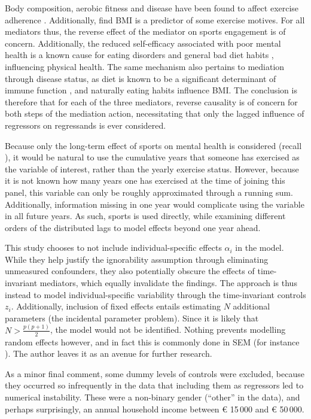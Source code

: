 Body composition, aerobic fitness and disease have been found to affect exercise adherence \cite{abernethy2012biophysical}.
Additionally,  find BMI is a predictor of some exercise motives.
For all mediators thus, the reverse effect of the mediator on sports engagement is of concern.
Additionally, the reduced self-efficacy associated with poor mental health is a known cause for
eating disorders and general bad diet habits \cite{oellingrath2014eating}, influencing physical health.
The same mechanism also pertains to mediation through disease status, as diet is known to be a
significant determinant of immune function \cite{childs2019diet}, and naturally eating habits influence BMI.
The conclusion is therefore that for each of the three mediators,
reverse causality is of concern for both steps of the mediation action,
necessitating that only the lagged influence of regressors on regressands is ever considered.

Because only the long-term effect of sports on mental health is considered (recall ),
it would be natural to use the cumulative years that someone has exercised as the variable of interest, rather than the
yearly exercise status. However, because it is not known how many years one has exercised at the time of joining this panel,
this variable can only be roughly approximated through a running sum. Additionally, information missing in one year would
complicate using the variable in all future years.
As such, sports is used directly, while examining different orders of the distributed lags to model effects beyond
one year ahead.

This study chooses to not include individual-specific effects $\alpha_i$ in the model. While they help justify
the ignorability assumption through eliminating unmeasured confounders, they also potentially obscure the effects of time-invariant mediators,
which equally invalidate the findings. The approach is thus instead to model individual-specific variability through the
time-invariant controls $z_i$. Additionally, inclusion of fixed effects entails estimating $N$ additional parameters
(the incidental parameter problem). Since it is likely that $N > \frac{p(p + 1)}{2}$, the model would not be identified.
Nothing prevents modelling random effects however, and in fact this is commonly done in SEM
(for instance ). The author leaves it as an avenue for further research.

As a minor final comment, some dummy levels of controls were excluded, because they occurred so infrequently in the data
that including them as regressors led to numerical instability.
These were a non-binary gender (``other'' in the data), and perhaps surprisingly,
an annual household income between € 15\,000 and € 50\,000.

